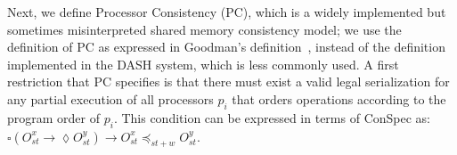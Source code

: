 \documentclass[journal,compsoc]{IEEEtran}
\begin{document}
 Next, we define Processor Consistency (PC), which is a widely implemented but sometimes misinterpreted shared memory consistency model; we use the definition of PC as expressed in %
  Goodman's definition~\cite{Ahamad:1993:PPC:165231.165264}, instead of the definition implemented in the DASH system, which is less commonly used. A first restriction that PC  specifies is that  there must exist a valid legal serialization for  any partial execution of 
  all processors $p_i$ that orders operations according to the program order of $p_i$.  This condition can be expressed in terms of ConSpec as:
  $ \square \left( O_\mathit{st}^x \rightarrow \lozenge O_\mathit{st}^{y} \right) 
 \rightarrow O_\mathit{st}^x \preccurlyeq_{\mathit{st}+w} 
 O_\mathit{st}^{y}$. 
\end{document}

